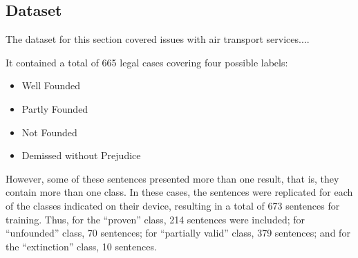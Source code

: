 

\subsection{Dataset}



The dataset for this section covered issues with air transport services....

It contained a total of 665 legal cases covering four possible labels:

\begin{itemize}[noitemsep]
    \item Well Founded
    \item Partly Founded
    \item Not Founded
    \item Demissed without Prejudice
\end{itemize}




However, some of these sentences presented more than one result, that is, they contain more than one class. In these cases, the sentences were replicated for each of the classes indicated on their device, resulting in a total of 673 sentences for training. Thus, for the “proven” class, 214 sentences were included; for “unfounded” class, 70 sentences; for “partially valid” class, 379 sentences; and for the “extinction” class, 10 sentences. 

